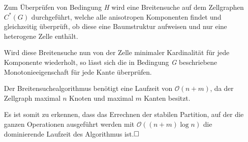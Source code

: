 Zum Überprüfen von Bedingung \emph{H} wird eine Breitensuche auf dem Zellgraphen $C^*(G)$ durchgeführt, welche alle anisotropen Komponenten findet und gleichzeitig überprüft, ob diese eine Baumstruktur aufweisen und nur eine heterogene Zelle enthält.

Wird diese Breitensuche nun von der Zelle minimaler Kardinalität für jede Komponente wiederholt, so lässt sich die in Bedingung \emph{G} beschriebene Monotonieeigenschaft für jede Kante überprüfen.

Der Breitensuchealgorithmus benötigt eine Laufzeit von $\mathcal{O}(n+m)$, da der Zellgraph maximal $n$ Knoten und maximal $m$ Kanten besitzt.

Es ist somit zu erkennen, dass das Errechnen der stabilen Partition, auf der die ganzen Operationen ausgeführt werden mit $\mathcal{O}((n+m)\log n)$ die dominierende Laufzeit des Algorithmus ist.$\hfill\square$